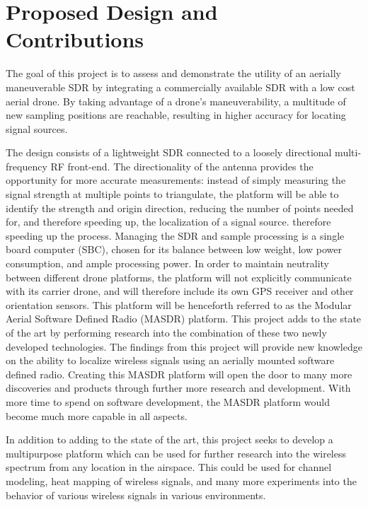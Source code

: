 \section{Proposed Design and Contributions}
The goal of this project is to assess and demonstrate the utility of an aerially maneuverable SDR by integrating a commercially available SDR with a low cost aerial drone. By taking advantage of a drone's maneuverability, a multitude of new sampling positions are reachable, resulting in higher accuracy for locating signal sources.\par
The design consists of a lightweight SDR connected to a loosely directional multi-frequency RF front-end. The directionality of the antenna provides the opportunity for more accurate measurements: instead of simply measuring the signal strength at multiple points to triangulate, the platform will be able to identify the strength and origin direction, reducing the number of points needed for, and therefore speeding up, the localization of a signal source. therefore speeding up the process. Managing the SDR and sample processing is a single board computer (SBC), chosen for its balance between low weight, low power consumption, and ample processing power. In order to maintain neutrality between different drone platforms, the platform will not explicitly communicate with its carrier drone, and will therefore include its own GPS receiver and other orientation sensors. This platform will be henceforth referred to as the Modular Aerial Software Defined Radio (MASDR) platform. This project adds to the state of the art by performing research into the combination of these two newly developed technologies. The findings from this project will provide new knowledge on the ability to localize wireless signals using an aerially mounted software defined radio. Creating this MASDR platform will open the door to many more discoveries and products through further more research and development. With more time to spend on software development, the MASDR platform would become much more capable in all aspects.\par
In addition to adding to the state of the art, this project seeks to develop a multipurpose platform which can be used for further research into the wireless spectrum from any location in the airspace. This could be used for channel modeling, heat mapping of wireless signals, and many more experiments into the behavior of various wireless signals in various environments.\par

